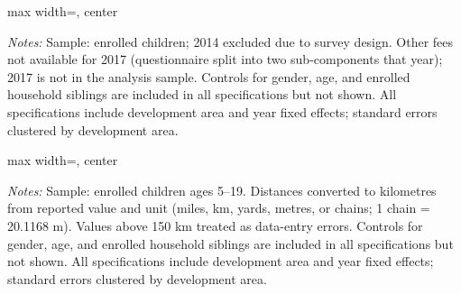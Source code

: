 \documentclass[12pt]{article}
\newcommand*{\TableLagOnePath}{../Paper_3_Tables/Lagged_1Year_Tables}
\begin{document}
	\begin{table}[H]
	\centering
	\begin{adjustbox}{max width=\linewidth, center}
	\begin{threeparttable}
		\caption{School Expenditure, Supplementary Categories (Log), IV Estimates}
		\label{tab:expenditures_supp_log}
		{\small}
		\begin{tablenotes}
			\small
			\item \textit{Notes:} Sample: enrolled children; 2014 excluded due to survey design. Other fees not available for 2017 (questionnaire split into two sub-components that year); 2017 is not in the analysis sample. Controls for gender, age, and enrolled household siblings are included in all specifications but not shown. All specifications include development area and year fixed effects; standard errors clustered by development area.
		\end{tablenotes}
	\end{threeparttable}
	\end{adjustbox}
	\end{table}

	\begin{table}[H]
	\centering
	\begin{adjustbox}{max width=\linewidth, center}
	\begin{threeparttable}
		\caption{Distance to School, IV Estimates}
		\label{tab:distance}
		{\small}
		\begin{tablenotes}
			\small
			\item \textit{Notes:} Sample: enrolled children ages 5--19. Distances converted to kilometres from reported value and unit (miles, km, yards, metres, or chains; 1 chain = 20.1168 m). Values above 150 km treated as data-entry errors. Controls for gender, age, and enrolled household siblings are included in all specifications but not shown. All specifications include development area and year fixed effects; standard errors clustered by development area.
		\end{tablenotes}
	\end{threeparttable}
	\end{adjustbox}
	\end{table}
\end{document}
